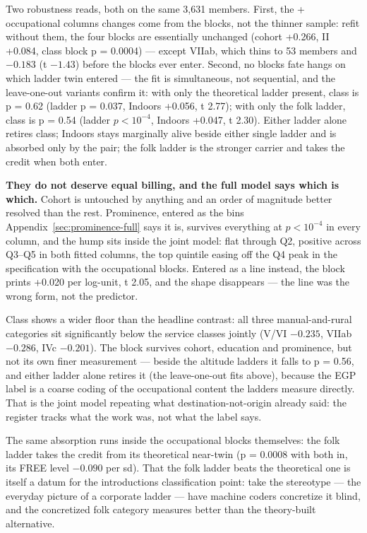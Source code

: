 Two robustness reads, both on the same 3,631 members. First, the +
occupational column\textquotesingle s changes come from the blocks, not the thinner
sample: refit without them, the four blocks are essentially unchanged
(cohort +0.266, II +0.084, class block p = 0.0004) --- except VIIab, which
thins to 53 members and \(-0.183\) (t \(-1.43\)) before the blocks ever enter.
Second, no block\textquotesingle s fate hangs on which ladder twin entered --- the fit is
simultaneous, not sequential, and the leave-one-out variants confirm it:
with only the theoretical ladder present, class is p = 0.62 (ladder
p = 0.037, Indoors +0.056, t 2.77); with only the folk ladder, class is
p = 0.54 (ladder \(p < 10^{-4}\), Indoors +0.047, t 2.30). Either ladder alone
retires class; Indoors stays marginally alive beside either single ladder
and is absorbed only by the pair; the folk ladder is the stronger carrier
and takes the credit when both enter.

\textbf{They do not deserve equal billing, and the full model says which is
which.} Cohort is untouched by anything and an order of magnitude better
resolved than the rest. Prominence, entered as the bins Appendix~\ref{sec:prominence-full} says it is,
survives everything at \(p < 10^{-4}\) in every column, and the hump sits inside the
joint model: flat through Q2, positive across Q3--Q5 in both fitted columns, the
top quintile easing off the Q4 peak in the specification with the occupational
blocks. Entered as a line instead, the block prints +0.020 per log-unit,
t 2.05, and the shape disappears --- the line was the wrong form, not the
predictor.

Class shows a wider floor than the headline contrast: all three
manual-and-rural categories sit significantly below the service classes
jointly (V/VI \(-0.235\), VIIab \(-0.286\), IVc \(-0.201\)). The block survives cohort,
education and prominence, but not its own finer measurement --- beside the
altitude ladders it falls to p = 0.56, and either ladder alone retires it
(the leave-one-out fits above), because the EGP label is a coarse coding of
the occupational content the ladders measure directly. That is the joint
model repeating what destination-not-origin already said: the register tracks
what the work was, not what the label says.

The same absorption runs inside the occupational blocks themselves: the folk ladder
takes the credit from its theoretical near-twin (p = 0.0008 with both in,
its FREE level \(-0.090\) per sd). That the folk ladder beats the theoretical
one is itself a datum for the introduction\textquotesingle s classification point: take the
stereotype --- the everyday picture of a corporate ladder --- have machine
coders concretize it blind, and the concretized folk category measures
better than the theory-built alternative.

